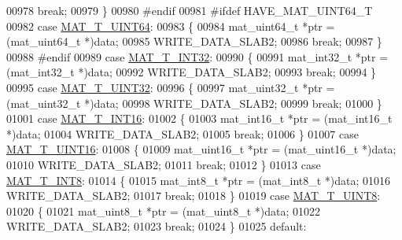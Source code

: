 \begin{DoxyCode}
{{{{00978             \textcolor{keywordflow}{break};
00979         \}
00980 \textcolor{preprocessor}{#endif}
00981 \textcolor{preprocessor}{#ifdef HAVE\_MAT\_UINT64\_T}
00982         \textcolor{keywordflow}{case} \hyperlink{group___m_a_t_ggacf7b3b879282b7ab3a51190e49bf3453a45547932c46be27118abe08302d7e29f}{MAT\_T\_UINT64}:
00983         \{
00984             mat\_uint64\_t *ptr = (mat\_uint64\_t *)data;
00985             WRITE\_DATA\_SLAB2;
00986             \textcolor{keywordflow}{break};
00987         \}
00988 \textcolor{preprocessor}{#endif}
00989         \textcolor{keywordflow}{case} \hyperlink{group___m_a_t_ggacf7b3b879282b7ab3a51190e49bf3453a83e06a68320726c6572bfbb9f3addb1d}{MAT\_T\_INT32}:
00990         \{
00991             mat\_int32\_t *ptr = (mat\_int32\_t *)data;
00992             WRITE\_DATA\_SLAB2;
00993             \textcolor{keywordflow}{break};
00994         \}
00995         \textcolor{keywordflow}{case} \hyperlink{group___m_a_t_ggacf7b3b879282b7ab3a51190e49bf3453aa397e285a23fe240368b752897652c6a}{MAT\_T\_UINT32}:
00996         \{
00997             mat\_uint32\_t *ptr = (mat\_uint32\_t *)data;
00998             WRITE\_DATA\_SLAB2;
00999             \textcolor{keywordflow}{break};
01000         \}
01001         \textcolor{keywordflow}{case} \hyperlink{group___m_a_t_ggacf7b3b879282b7ab3a51190e49bf3453a8c5b2e381946e95ea8d81ac216743302}{MAT\_T\_INT16}:
01002         \{
01003             mat\_int16\_t *ptr = (mat\_int16\_t *)data;
01004             WRITE\_DATA\_SLAB2;
01005             \textcolor{keywordflow}{break};
01006         \}
01007         \textcolor{keywordflow}{case} \hyperlink{group___m_a_t_ggacf7b3b879282b7ab3a51190e49bf3453a05bc7af7680aa68be95126ae0a4c2e31}{MAT\_T\_UINT16}:
01008         \{
01009             mat\_uint16\_t *ptr = (mat\_uint16\_t *)data;
01010             WRITE\_DATA\_SLAB2;
01011             \textcolor{keywordflow}{break};
01012         \}
01013         \textcolor{keywordflow}{case} \hyperlink{group___m_a_t_ggacf7b3b879282b7ab3a51190e49bf3453a9807f5033ed4f9b548953742d9fd1658}{MAT\_T\_INT8}:
01014         \{
01015             mat\_int8\_t *ptr = (mat\_int8\_t *)data;
01016             WRITE\_DATA\_SLAB2;
01017             \textcolor{keywordflow}{break};
01018         \}
01019         \textcolor{keywordflow}{case} \hyperlink{group___m_a_t_ggacf7b3b879282b7ab3a51190e49bf3453a01c1bd7db68f90552862eb5d311be408}{MAT\_T\_UINT8}:
01020         \{
01021             mat\_uint8\_t *ptr = (mat\_uint8\_t *)data;
01022             WRITE\_DATA\_SLAB2;
01023             \textcolor{keywordflow}{break};
01024         \}
01025         \textcolor{keywordflow}{default}:
}}}}
\end{DoxyCode}
